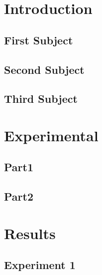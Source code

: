 \documentclass[12pt]{article}
\numberwithin{equation}{section} %
\numberwithin{figure}{section} %
\numberwithin{table}{section} %
\newcommand{\sectionInput}[1] {
  
}
\begin{document}
\sectionInput{Title page}
\newpage

\tableofcontents
\newpage

\pagestyle{plain}
\thispagestyle{fancy}

\section{Introduction}\label{section:1}
\sectionInput{1 - Introduction/Intro}

\subsection{First Subject}\label{subsection:1.1}
\sectionInput{1 - Introduction/FirstSub}

\subsection{Second Subject}\label{subsection:1.2}
\sectionInput{1 - Introduction/SecondSub}

\subsection{Third Subject}\label{subsection:1.3}
\sectionInput{1 - Introduction/ThirdSub}

\section{Experimental}\label{section:2}
\sectionInput{2 - Experimental Setup/IntroSetup}

\subsection{Part1}\label{subsection:2.1}
\sectionInput{2 - Experimental Setup/Part1}

\subsection{Part2}\label{subsection:2.2}
\sectionInput{2 - Experimental Setup/Part2}

\section{Results}\label{section:3}
\subsection{Experiment 1}\label{subsection:3.1}
\sectionInput{3 - Results/Experiment1}
\end{document}
